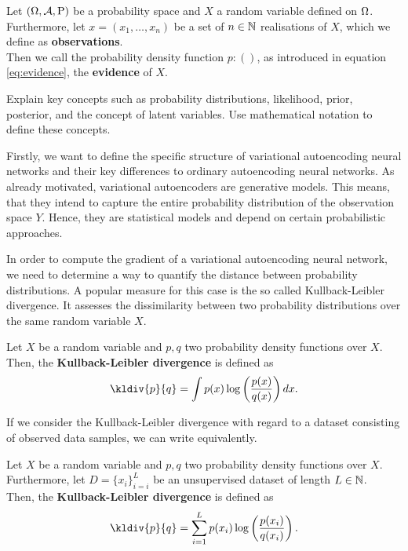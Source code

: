 \begin{definition}\label{def:evidence}
Let $(\Omega, \operatorname{\mathcal{A}}, \operatorname{\text{P}})$ be a probability space and $X$ a random variable defined on $\Omega$. Furthermore, let $x = (x_1, \ldots, x_n)$ be a set of $n\in\operatorname{\mathbb{N}}$ realisations of $X$, which we define as \textbf{observations}.\\
Then we call the probability density function $p: ()$, as introduced in equation \eqref{eq:evidence}, the \textbf{evidence} of $X$.
\end{definition}




Explain key concepts such as probability distributions, likelihood, prior, posterior, and the concept of latent variables. Use mathematical notation to define these concepts.


Firstly, we want to define the specific structure of variational autoencoding neural networks and their key differences to ordinary autoencoding neural networks. As already motivated, variational autoencoders are generative models. This means, that they intend to capture the entire probability distribution of the observation space $Y$. Hence, they are statistical models and depend on certain probabilistic approaches.










In order to compute the gradient of a variational autoencoding neural network, we need to determine a way to quantify the distance between probability distributions. A popular measure for this case is the so called Kullback-Leibler divergence. It assesses the dissimilarity between two probability distributions over the same 	random variable $X$.
\begin{definition}\label{def_kl_div}
Let $X$ be a random variable and $p, q$ two probability density functions over $X$. Then, the \textbf{Kullback-Leibler divergence} is defined as
\begin{align}
\kldiv{p}{q} = \int p(x) \log \left( \frac{p(x)}{q(x)}\right) dx.
\end{align}
\end{definition}

If we consider the Kullback-Leibler divergence with regard to a dataset consisting of observed data samples, we can write equivalently.

\begin{definition}
Let $X$ be a random variable and $p, q$ two probability density functions over $X$. Furthermore, let $D=\{x_i\}_{i=i}^L$ be an unsupervised dataset of length $L\in\operatorname{\mathbb{N}}$.\\
Then, the \textbf{Kullback-Leibler divergence} is defined as
\begin{align}
\kldiv{p}{q} = \sum_{i=1}^L p(x_i) \log \left( \frac{p(x_i)}{q(x_i)}\right).
\end{align}
\end{definition}

